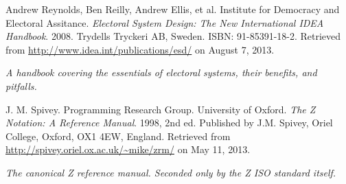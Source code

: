 
\begin{thebibliography}{9} %


Andrew Reynolds, Ben Reilly, Andrew Ellis, et al. Institute for Democracy and
Electoral Assitance. \emph{Electoral System Design: The New International IDEA
Handbook}. 2008. Trydells Tryckeri AB, Sweden. ISBN: 91-85391-18-2. Retrieved
from \url{http://www.idea.int/publications/esd/} on August 7, 2013.

\emph{A handbook covering the essentials of electoral systems, their benefits,
and pitfalls.}


J. M. Spivey. Programming Research Group. University of Oxford. \emph{The Z
Notation: A Reference Manual}. 1998, 2nd ed. Published by J.M. Spivey, Oriel
College, Oxford, OX1 4EW, England. Retrieved from
\url{http://spivey.oriel.ox.ac.uk/~mike/zrm/} on May 11, 2013.

\emph{The canonical Z reference manual. Seconded only by the Z ISO standard
itself.}

\end{thebibliography}

